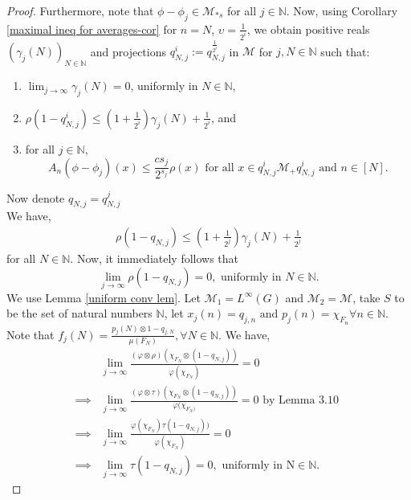 \documentclass[11pt]{amsart}
\theoremstyle{definition}
\theoremstyle{myremark}
\numberwithin{equation}{section}
\newcommand{\CM}{\mathcal{M}}
\begin{document}
\begin{proof}
		Furthermore, note that $\phi - \phi_j \in \mathcal{M}_{*s}$ for all $j \in \mathbb{N}$. Now, using Corollary \ref{maximal ineq for averages-cor} for $n = N$, $\upsilon = \frac{1}{2^i}$, we obtain positive reals $({\gamma_j(N)})_{N \in \mathbb{N}}$ and projections $ q_{N,j}^{i} := q^{ \frac{1}{2^i}}_{ N, j} $ in $\mathcal{M}$ for $ j , N \in \mathbb{N}$ such that:
		\begin{enumerate}\setlength\itemsep{.7em}
			\item $ \displaystyle \lim_{j \to \infty} \gamma_j(N) = 0$, uniformly in $N \in \mathbb{N}$,   
			\item $ \rho(1- q^{i}_{N,j}) \leq ( 1+ \frac{1}{2^i})\gamma_j(N) + \frac{1}{2^i} $, and
			\item for all $j \in \mathbb{N}$, 
			\[
			A_n(\phi - \phi_j)(x) \leq  \frac{cs_j}{2^{s_j}}  \rho(x) \text{ for all } x \in q^{i}_{N,j} \mathcal{M}_+ q^{i}_{N, j} \text{ and } n \in [N].
			\]
		\end{enumerate}
        Now denote $q_{N,j} = q^{j}_{N,j}$ \\
        We have,
        \begin{align*}
        \rho(1-q_{N,j}) \leq (1+ \frac{1}{2^j})\gamma_j(N) + \frac{1}{2^j}
        \end{align*} for all $N \in \mathbb{N}$.
		Now, it immediately follows that
		\[
		\displaystyle \lim_{j \to \infty}  \rho(1- q_{N, j}) = 0, \text{ uniformly in }  N \in \mathbb{N}. 
		\]
		We use Lemma \ref{uniform conv lem}. Let $\CM_{1}=L^{\infty}(G)$ and $\CM_{2}=\CM$, take $S$ to be the set of natural numbers $\mathbb{N}$, let  $x_{j}(n)=q_{j,n} \text{ and } p_{j}(n)=\chi_{F_{n}}  \forall n \in \mathbb{N}$. Note that $f_{j}(N)=\frac{p_{j}(N) \otimes 1-q_{j,N}}{\mu(F_{N})},\forall N \in \mathbb{N}$. We have,
        \begin{align*}
        &\lim_{j \rightarrow \infty}\frac{(\varphi \otimes \rho)(\chi_{F_{N}}\otimes(1-q_{N,j}))}{\varphi(\chi_{F_{N}})} = 0 \\
        \implies & \lim_{j \rightarrow \infty}\frac{(\varphi \otimes \tau)(\chi_{F_{N}}\otimes(1-q_{N,j}))}{\varphi(\chi_{F_{N})}} = 0 \text{ by Lemma 3.10 } \\
        \implies & \lim_{j \rightarrow \infty}\frac{\varphi(\chi_{F_{N}})\tau(1-q_{N,j}))}{\varphi(\chi_{F_{N}})} = 0 \\
        \implies & \lim_{j \rightarrow \infty}\tau(1-q_{N,j})=0, \text{ uniformly in N}\in \mathbb{N}.
        \end{align*}
		

\end{proof}
\end{document}
